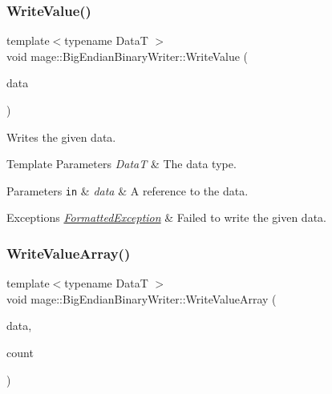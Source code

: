 \subsubsection{\texorpdfstring{Write\+Value()}{WriteValue()}}
{\footnotesize\ttfamily template$<$typename DataT $>$ \\
void mage\+::\+Big\+Endian\+Binary\+Writer\+::\+Write\+Value (\begin{DoxyParamCaption}\item[{const DataT \&}]{data }\end{DoxyParamCaption})\hspace{0.3cm}{\ttfamily [protected]}}

Writes the given data.


\begin{DoxyTemplParams}{Template Parameters}
{\em DataT} & The data type. \\
\hline
\end{DoxyTemplParams}

\begin{DoxyParams}[1]{Parameters}
\mbox{\tt in}  & {\em data} & A reference to the data. \\
\hline
\end{DoxyParams}

\begin{DoxyExceptions}{Exceptions}
{\em \hyperlink{classmage_1_1_formatted_exception}{Formatted\+Exception}} & Failed to write the given data. \\
\hline
\end{DoxyExceptions}
\hypertarget{classmage_1_1_big_endian_binary_writer_a70459f96b5389052d6e090e124c5468b}{}\label{classmage_1_1_big_endian_binary_writer_a70459f96b5389052d6e090e124c5468b} 
\subsubsection{\texorpdfstring{Write\+Value\+Array()}{WriteValueArray()}}
{\footnotesize\ttfamily template$<$typename DataT $>$ \\
void mage\+::\+Big\+Endian\+Binary\+Writer\+::\+Write\+Value\+Array (\begin{DoxyParamCaption}\item[{const DataT $\ast$}]{data,  }\item[{size\+\_\+t}]{count }\end{DoxyParamCaption})\hspace{0.3cm}{\ttfamily [protected]}}

